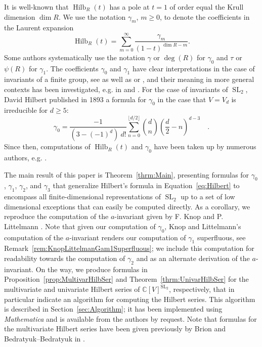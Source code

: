 \documentclass{amsart}
\theoremstyle{definition}
\theoremstyle{remark}
\newcommand{\C}{\mathbb{C}}
\newcommand{\SL}{\operatorname{SL}}
\newcommand{\Hilb}{\operatorname{Hilb}}
\begin{document}
It is well-known that $\Hilb_R(t)$ has a pole at $t = 1$ of order equal the Krull dimension $\dim R$.
We use the notation $\gamma_m$, $m\ge 0$, to denote the coefficients  in the Laurent expansion
\begin{equation}
\label{eq:DefGammas}
    \Hilb_R(t) = \sum\limits_{m=0}^\infty \frac{\gamma_m}{(1 - t)^{\dim R-m}}.
\end{equation}
Some authors systematically use the notation $\gamma$ or $\deg(R)$ for $\gamma_0$ and $\tau$ or $\psi(R)$ for $\gamma_1$.
The coefficients $\gamma_0$ and $\gamma_1$ have clear interpretations in
the case of invariants of a finite group, see \cite[Lemma 2.4.4]{SturmfelsBook} as well as \cite[Section 3.13]{BensonBook}
or \cite{BensonCrawleyBoevey}, and their meaning in more general contexts has been investigated, e.g. in
\cite{AvramovBuchweitzSally} and \cite[Chapter~3]{PopovBook}.
For the case of invariants of $\SL_2$, David Hilbert \cite{Hilbert} published in 1893 a formula for $\gamma_0$ in the
case that $V=V_d$ is irreducible for $d\ge 5$:
\begin{equation} \label{eq:Hilbert}
    \gamma_0
        =   \frac{-1}{(3-(-1)^d)\:d!}\sum_{n=0}^{\lfloor d/2\rfloor}{d\choose n}
                \left(\frac{d}{2} - n \right)^{d-3}\quad.
\end{equation}
Since then, computations of $\Hilb_R(t)$ and $\gamma_0$ have been taken up by numerous authors, e.g.
\cite{BedratyukPoincareCovariants,BedratyukBivarPoincare,BedratyukSL2Invariants,BedratyukSL2MiltigradPoincare,
BedratyukBedratyukMultivarPoincare, BedratyukIlashCovariants,IlashPoincareNLinForm,
IlashPoincareNQuadForm,LittelmannProcesi,Springer}.

The main result of this paper is  Theorem~\ref{thrm:Main}, presenting formulas for $\gamma_0$, $\gamma_1$, $\gamma_2$,
and $\gamma_3$ that generalize Hilbert's formula in Equation~\eqref{eq:Hilbert} to encompass all finite-dimensional
representations of $\SL_2$ up to a set of low dimensional exceptions that can easily be computed directly.
As a corollary, we reproduce the computation
of the $a$-invariant given by F. Knop and P. Littelmann \cite{KnopLittelmann}. Note that
given our computation of $\gamma_0$, Knop and Littelmann's computation of the $a$-invariant
renders our computation of $\gamma_1$ superfluous, see
Remark~\ref{rem:KnopLittelmanGam1Superfluous}; we include this computation for readability towards
the computation of $\gamma_2$
and as an alternate derivation of the $a$-invariant. On the way, we produce
formulas in Proposition~\ref{prop:MultivarHilbSer} and Theorem~\ref{thrm:UnivarHilbSer} for
the multivariate and univariate Hilbert series of $\C[V]^{\SL_2}$, respectively, that in
particular indicate an algorithm for computing the Hilbert
series. This algorithm is described in Section~\ref{sec:Algorithm}; it has been implemented using \emph{Mathematica}
\cite{Mathematica} and is available from the authors by request.
Note that formulas for the multivariate Hilbert series have been given previously
by Brion \cite[Th\'{e}or\`{e}me 1]{Brion} and Bedratyuk--Bedratyuk in
\cite[Theorem 3]{BedratyukBedratyukMultivarPoincare}.
\end{document}
